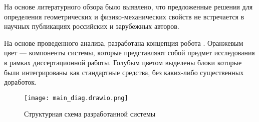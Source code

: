 На основе литературного обзора было выявлено, что предложенные решения для определения геометрических и физико-механических свойств не встречается в научных публикациях российских и зарубежных авторов.

На основе проведенного анализа, разработана концепция робота . Оранжевым цвет --- компоненты системы, которые представляют собой предмет исследования в рамках диссертационной работы. Голубым цветом выделены блоки которые были интегрированы как стандартные средства, без каких-либо существенных доработок.
\begin{figure}[ht!]
    \centering\texttt{[image: main\_diag.drawio.png]}
    \caption{Структурная схема разработанной системы}
    \label{fig:diag_system.png}
\end{figure}


